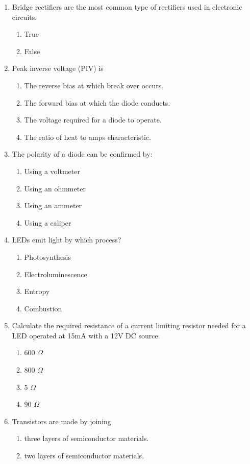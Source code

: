 \documentclass[10pt]{article}
\begin{document}
\begin{multicols}{2}
\begin{enumerate}
\item Bridge rectifiers are the most common type of rectifiers used in electronic circuits.
	\begin{enumerate}
	\item True
	\item False
	\end{enumerate}
\item Peak inverse voltage (PIV) is
	\begin{enumerate}
	\item The reverse bias at which break over occurs.
	\item The forward bias at which the diode conducts.
	\item The voltage required for a diode to operate.
	\item The ratio of heat to amps characteristic.
	\end{enumerate}
\item The polarity of a diode can be confirmed by:
	\begin{enumerate}
	\item Using a voltmeter
	\item Using an ohmmeter
	\item Using an ammeter
	\item Using a caliper
	\end{enumerate}
\item LEDs emit light by which process?
	\begin{enumerate}
	\item Photosynthesis
	\item Electroluminescence
	\item Entropy
	\item Combustion
	\end{enumerate}
\item Calculate the required resistance of a current limiting resistor needed for a LED operated at 15mA with a 12V DC source.
	\begin{enumerate}
	\item 600 $\Omega$
	\item 800 $\Omega$
	\item 5 $\Omega$
	\item 90 $\Omega$
	\end{enumerate}
\item Transistors are made by joining
	\begin{enumerate}
	\item three layers of semiconductor materials.
	\item two layers of semiconductor materials.

\end{enumerate}
\end{enumerate}
\end{multicols}
\end{document}

